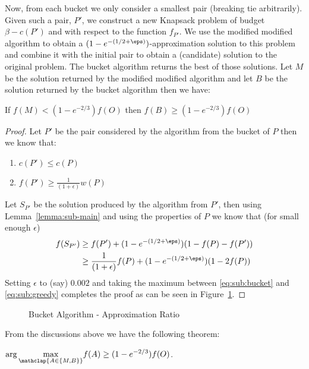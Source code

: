 Now, from each bucket we only consider a smallest pair (breaking tie arbitrarily).
Given such a pair, $P'$, we construct a new Knapsack problem of budget $\beta - c(P')$ and with respect to the function $f_{P'}$.
We use the modified modified algorithm to obtain a $(1-e^{-(1/2 + \eps)})$-approximation
solution to this problem and combine it with the initial pair to obtain a (candidate)
solution to the original problem.
The bucket algorithm returns the best of those solutions.
Let $M$ be the solution returned by the modified modified algorithm and let $B$ be the solution returned by the bucket algorithm then we have:

\begin{lemma}
	If $f(M) < (1 - e^{-2/3})f(O)$ then $f(B) \geq (1 - e^{-2/3})f(O)$
\end{lemma}

\begin{proof}
	Let $P'$ be the pair considered by the algorithm from the bucket of $P$ then we know that:
	\begin{enumerate}
		\item $c(P') \leq c(P)$
		\item $f(P') \geq \frac{1}{(1 + \epsilon)}w(P)$
	\end{enumerate}
	Let $S_{P'}$ be the solution produced by the algorithm from $P'$,
	then using Lemma~\ref{lemma:sub-main} and using the properties of $P$ we know that (for small enough $\epsilon$)
	\begin{align}
		f(S_{P'}) & \geq f(P') + (1-e^{-(1/2 + \eps)})(1 - f(P) - f(P'))
		\\ & 
		\geq \frac{1}{(1 + \epsilon)}f(P) + (1-e^{-(1/2 + \eps)})(1 - 2f(P))
		\label{eq:sub:bucket}
	\end{align}
	Setting $\epsilon$ to (say) $0.002$ and taking the maximum between \ref{eq:sub:bucket} and
	\ref{eq:sub:greedy} completes the proof as can be seen in Figure~\ref{fig:sub:bucket}.
\end{proof}

\begin{figure}
	\def\zeta{0.002}
	\caption{
		\label{fig:sub:bucket}
		Bucket Algorithm - Approximation Ratio
	}
\end{figure}

From the discussions above we have the following theorem:

\begin{theorem}
	$\displaystyle{\arg\max_{\mathclap{A \in \{M, B\}}}}f(A) \geq (1 - e^{-2/3})f(O)$.
\end{theorem}
